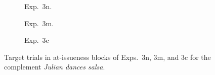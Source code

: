 \documentclass[11pt,fleqn]{article}
\newcommand{\6}{\mbox{$[\hspace*{-.6mm}[$}}
\newcommand{\9}{\mbox{$]\hspace*{-.6mm}]$}}
\begin{document}
\begin{figure}[h!]
\centering

\begin{subfigure}[t]{0.5\textwidth}
        \centering
{}
\caption{Exp.~3n.}\label{fig-exp1q-ai}
\end{subfigure}%
\begin{subfigure}[t]{0.5\textwidth}
\centering
{} 
\caption{Exp.~3m.}\label{fig-exp2q-ai}
 \end{subfigure}
\begin{subfigure}[t]{0.5\textwidth}
        \centering
{}
\caption{Exp.~3c}\label{fig-exp3q-ai}
 \end{subfigure}

\caption{Target trials in at-issueness blocks of Exps.~3n, 3m, and 3c for the complement {\em Julian dances salsa}.}\label{f-ai-trialsq}
\end{figure}
\end{document}
